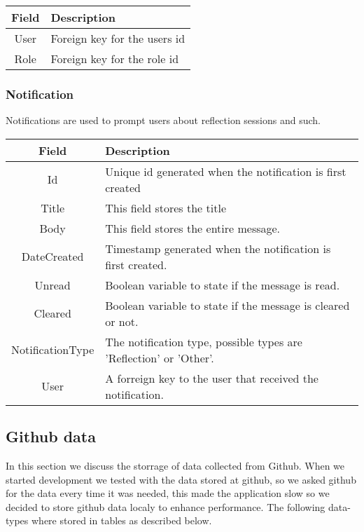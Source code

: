 \vspace{0.5cm}
\begin{tabularx}{\linewidth}{| c | X |}
    \hline
    \rowcolor[gray]{0.8}
    \textbf{Field} & \textbf{Description} \\
    \hline
    User & Foreign key for the users id \\ \hline
    Role & Foreign key for the role id \\
    \hline
\end{tabularx}
\vspace{0.5cm}

\subsubsection*{Notification}
Notifications are used to prompt users about reflection sessions and such. \\

\vspace{0.5cm}
\begin{tabularx}{\linewidth}{| c | X |}
    \hline
    \rowcolor[gray]{0.8}
    \textbf{Field} & \textbf{Description} \\
    \hline
    Id & Unique id generated when the notification is first created\\ \hline
    Title & This field stores the title\\ \hline
   	Body & This field stores the entire message.\\ \hline
    DateCreated & Timestamp generated when the notification is first created.\\ \hline
    Unread & Boolean variable to state if the message is read.\\ \hline
    Cleared & Boolean variable to state if the message is cleared or not.\\ \hline
    NotificationType & The notification type, possible types are 'Reflection' or 'Other'.\\ \hline
    User & A forreign key to the user that received the notification.\\ 
    \hline
\end{tabularx}
\vspace{0.5cm}

\subsection{Github data}
In this section we discuss the storrage of data collected from Github. When we started development we tested with the data stored at github, so we asked github for the data every time it was needed, this made the application slow so we decided to store github data localy to enhance performance. The following data-types where stored in tables as described below.


